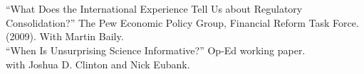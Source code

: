 \documentclass[11pt]{article}
\begin{document}
\vspace{.3in}
\begin{minipage}[t]{.21\textwidth}
	\hspace*{.6in}   \\
	  \\
\end{minipage}
\begin{minipage}[t]{.79\textwidth}
	``What Does the International Experience Tell Us about Regulatory Consolidation?'' The Pew Economic Policy Group,
Financial Reform Task Force. (2009). With Martin Baily. \\

``When Is Unsurprising Science Informative?'' Op-Ed working paper. \\
with Joshua D. Clinton and Nick Eubank. \\


\end{minipage}
\end{document}
